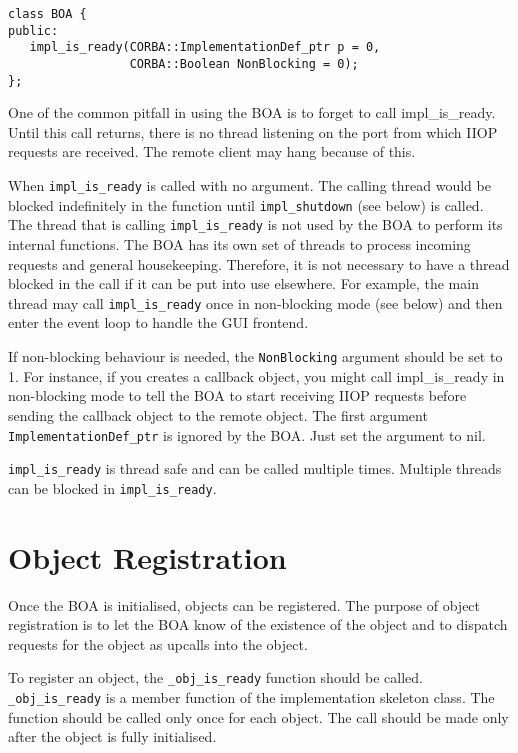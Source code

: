 \documentclass[11pt,twoside,onecolumn]{book}
\begin{document}
{\small
\begin{verbatim}
class BOA {
public:
   impl_is_ready(CORBA::ImplementationDef_ptr p = 0,
                 CORBA::Boolean NonBlocking = 0);
};
\end{verbatim}
}

One of the common pitfall in using the BOA is to forget to call
impl\_is\_ready. Until this call returns, there is no thread listening on
the port from which IIOP requests are received. The remote client may hang
because of this.

When {\tt impl\_is\_ready} is called with no argument. The calling thread
would be blocked indefinitely in the function until {\tt impl\_shutdown}
(see below) is called. The thread that is calling {\tt impl\_is\_ready}
is not used by the BOA to perform its internal functions. The BOA has its
own set of threads to process incoming requests and general
housekeeping. Therefore, it is not necessary to have a thread blocked in
the call if it can be put into use elsewhere. For example, the main thread
may call {\tt impl\_is\_ready} once in non-blocking mode (see below) and
then enter the event loop to handle the GUI frontend.

If non-blocking behaviour is needed, the {\tt NonBlocking} argument should be
set to 1. For instance, if you creates a callback object, you might call
impl\_is\_ready in non-blocking mode to tell the BOA to start receiving
IIOP requests before sending the callback object to the remote object. The
first argument {\tt ImplementationDef\_ptr} is ignored by the BOA. Just set
the argument to nil.

{\tt impl\_is\_ready} is thread safe and can be called multiple
times. Multiple threads can be blocked in {\tt impl\_is\_ready}.

\section{Object Registration}

Once the BOA is initialised, objects can be registered. The
purpose of object registration is to let the BOA know of the existence of
the object and to dispatch requests for the object as upcalls into the
object. 

To register an object, the {\tt \_obj\_is\_ready} function should be
called. {\tt \_obj\_is\_ready} is a member function of the implementation
skeleton class. The function should be called only once for each object.
The call should be made only after the object is fully initialised.
\end{document}

